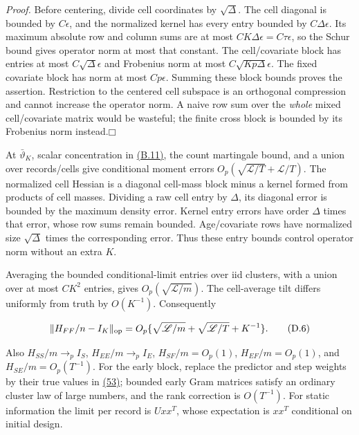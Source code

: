 \documentclass[11pt]{article}
\providecommand{\square}{\mdlgwhtsquare}
\begin{document}
\emph{Proof.} Before centering, divide cell coordinates by \(\sqrt\Delta\). The cell diagonal is bounded by \(C\epsilon\), and the normalized kernel has every entry bounded by \(C\Delta\epsilon\). Its maximum absolute row and column sums are at most \(CK\Delta\epsilon=C\tau\epsilon\), so the Schur bound gives operator norm at most that constant. The cell/covariate block has entries at most \(C\sqrt\Delta\epsilon\) and Frobenius norm at most \(C\sqrt{Kp\Delta}\epsilon\). The fixed covariate block has norm at most \(Cp\epsilon\). Summing these block bounds proves the assertion. Restriction to the centered cell subspace is an orthogonal compression and cannot increase the operator norm. A naive row sum over the \emph{whole} mixed cell/covariate matrix would be wasteful; the finite cross block is bounded by its Frobenius norm instead.\hfill$\square$

At \(\bar\vartheta_K\), scalar concentration in \hyperref[eq:B.11]{(B.11)}, the count martingale bound, and a union over records/cells give conditional moment errors
\(O_p(\sqrt{\mathscr L/T}+\mathscr L/T)\).
The normalized cell Hessian is a diagonal cell-mass block minus a kernel formed from products of cell masses. Dividing a raw cell entry by \(\Delta\), its diagonal error is bounded by the maximum density error. Kernel entry errors have order \(\Delta\) times that error, whose row sums remain bounded. Age/covariate rows have normalized size \(\sqrt\Delta\) times the corresponding error. Thus these entry bounds control operator norm without an extra \(K\).

Averaging the bounded conditional-limit entries over iid clusters, with a union over at most \(CK^2\) entries, gives \(O_p(\sqrt{\mathscr L/m})\). The cell-average tilt differs uniformly from truth by \(O(K^{-1})\). Consequently

\begin{equation*}
\|H_{FF}/n-I_K\|_{\rm op}
=O_p\{\sqrt{\mathscr L/m}+\sqrt{\mathscr L/T}+K^{-1}\}.
\tag{D.6}\label{eq:D.6}
\end{equation*}

Also \(H_{SS}/m\to_p I_S\), \(H_{EE}/m\to_p I_E\),
\(H_{SF}/m=O_p(1)\), \(H_{EF}/m=O_p(1)\), and
\(H_{SE}/m=O_p(T^{-1})\).
For the early block, replace the predictor and step weights by their true values in \hyperref[eq:53]{(53)}; bounded early Gram matrices satisfy an ordinary cluster law of large numbers, and the rank correction is \(O(T^{-1})\). For static information the limit per record is \(Uxx^T\), whose expectation is \(xx^T\) conditional on initial design.
\end{document}
